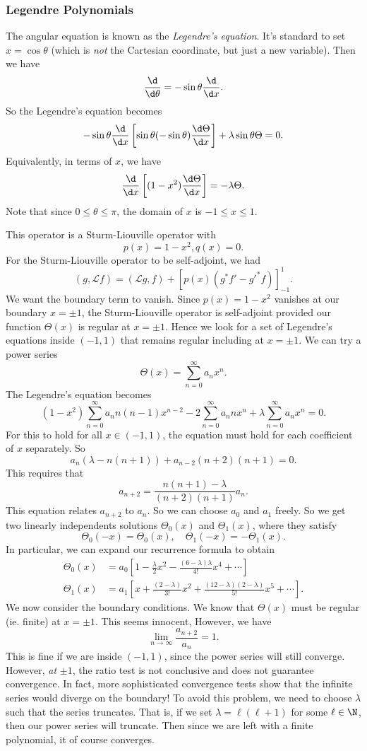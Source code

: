 \documentclass[a4paper]{article}
\begin{document}
\subsubsection{Legendre Polynomials}
The angular equation is known as the \emph{Legendre's equation}. It's standard to set $x = \cos \theta$ (which is \emph{not} the Cartesian coordinate, but just a new variable). Then we have
\[
  \frac{\d}{\d \theta} = -\sin \theta \frac{\d}{\d x}.
\]
So the Legendre's equation becomes
\[
  -\sin \theta \frac{\d}{\d x}\left[\sin \theta (-\sin \theta) \frac{\d \Theta}{\d x}\right]+ \lambda \sin \theta \Theta = 0.
\]
Equivalently, in terms of $x$, we have
\[
  \frac{\d}{\d x}\left[(1 - x^2) \frac{\d \Theta}{\d x}\right] = -\lambda \Theta.
\]
Note that since $0 \leq \theta \leq \pi$, the domain of $x$ is $-1 \leq x \leq 1$.

This operator is a Sturm-Liouville operator with
\[
  p(x) = 1 - x^2, q(x) = 0.
\]
For the Sturm-Liouville operator to be self-adjoint, we had
\[
  (g, \mathcal{L} f) = (\mathcal{L}g, f) + [p(x) (g^* f' - g'^* f)]^{1}_{-1}.
\]
We want the boundary term to vanish. Since $p(x) = 1- x^2$ vanishes at our boundary $x = \pm 1$, the Sturm-Liouville operator is self-adjoint provided our function $\Theta(x)$ is regular at $x = \pm 1$. Hence we look for  a set of Legendre's equations inside $(-1, 1)$ that remains regular including at $x = \pm 1$. We can try a power series
\[
  \Theta(x) = \sum_{n = 0}^\infty a_n x^n.
\]
The Legendre's equation becomes
\[
  (1 - x^2) \sum_{n = 0}^\infty a_n n(n - 1)x^{n - 2} - 2\sum_{n = 0}^\infty a_n nx^n + \lambda \sum_{n = 0}^\infty a_n x^n = 0.
\]
For this to hold for all $x\in (-1, 1)$, the equation must hold for each coefficient of $x$ separately. So
\[
  a_n(\lambda - n(n + 1)) + a_{n - 2}(n + 2)(n + 1) = 0.
\]
This requires that
\[
  a_{n + 2} = \frac{n(n + 1) - \lambda}{(n + 2)(n + 1)} a_n.
\]
This equation relates $a_{n + 2}$ to $a_n$. So we can choose $a_0$ and $a_1$ freely. So we get two linearly independents solutions $\Theta_0(x)$ and $\Theta_1(x)$, where they satisfy
\[
  \Theta_0(-x) = \Theta_0(x), \quad \Theta_1(-x) = -\Theta_1(x).
\]
In particular, we can expand our recurrence formula to obtain
\begin{align*}
  \Theta_0(x) &= a_0 \left[1 - \frac{\lambda}{2} x^2 - \frac{(6 - \lambda)\lambda}{4!}x^4 + \cdots\right]\\
  \Theta_1(x) &= a_1 \left[x + \frac{(2 - \lambda)}{3!}x^2 + \frac{(12 - \lambda)(2 - \lambda)}{5!}x^5 + \cdots\right].
\end{align*}
We now consider the boundary conditions. We know that $\Theta(x)$ must be regular (ie. finite) at $x = \pm 1$. This seems innocent, However, we have
\[
  \lim_{n \to \infty}\frac{a_{n + 2}}{a_n} = 1.
\]
This is fine if we are inside $(-1, 1)$, since the power series will still converge. However, \emph{at} $\pm 1$, the ratio test is not conclusive and does not guarantee convergence. In fact, more sophisticated convergence tests show that the infinite series would diverge on the boundary! To avoid this problem, we need to choose $\lambda$ such that the series truncates. That is, if we set $\lambda = \ell(\ell + 1)$ for some $\ell \in \N$, then our power series will truncate. Then since we are left with a finite polynomial, it of course converges.
\end{document}
